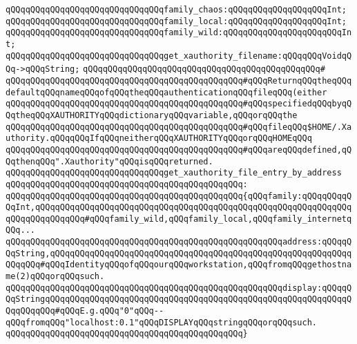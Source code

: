 \verb|qQQqqQQqqQQqqQQqqQQqqQQqqQQqqQQqfamily_chaos:qQQqqQQqqQQqqQQqqQQqInt;|\newline
\verb|qQQqqQQqqQQqqQQqqQQqqQQqqQQqqQQqfamily_local:qQQqqQQqqQQqqQQqqQQqInt;|\newline
\verb|qQQqqQQqqQQqqQQqqQQqqQQqqQQqqQQqfamily_wild:qQQqqQQqqQQqqQQqqQQqqQQqInt;|\newline
\newline
\verb|qQQqqQQqqQQqqQQqqQQqqQQqqQQqqQQqget_xauthority_filename:qQQqqQQqVoidqQQq->qQQqString;|\newline
\verb|qQQqqQQqqQQqqQQqqQQqqQQqqQQqqQQqqQQqqQQqqQQqqQQq#|\newline
\verb|qQQqqQQqqQQqqQQqqQQqqQQqqQQqqQQqqQQqqQQqqQQqqQQq#qQQqReturnqQQqtheqQQqdefaultqQQqnameqQQqofqQQqtheqQQqauthenticationqQQqfileqQQq(either|\newline
\verb|qQQqqQQqqQQqqQQqqQQqqQQqqQQqqQQqqQQqqQQqqQQqqQQq#qQQqspecifiedqQQqbyqQQqtheqQQqXAUTHORITYqQQqdictionaryqQQqvariable,qQQqorqQQqthe|\newline
\verb|qQQqqQQqqQQqqQQqqQQqqQQqqQQqqQQqqQQqqQQqqQQqqQQq#qQQqfileqQQq$HOME/.Xauthority.qQQqqQQqIfqQQqneitherqQQqXAUTHORITYqQQqorqQQqHOMEqQQq|\newline
\verb|qQQqqQQqqQQqqQQqqQQqqQQqqQQqqQQqqQQqqQQqqQQqqQQq#qQQqareqQQqdefined,qQQqthenqQQq".Xauthority"qQQqisqQQqreturned.|\newline
\newline
\newline
\verb|qQQqqQQqqQQqqQQqqQQqqQQqqQQqqQQqget_xauthority_file_entry_by_address|\newline
\verb|qQQqqQQqqQQqqQQqqQQqqQQqqQQqqQQqqQQqqQQqqQQqqQQq:|\newline
\verb|qQQqqQQqqQQqqQQqqQQqqQQqqQQqqQQqqQQqqQQqqQQqqQQq{qQQqfamily:qQQqqQQqqQQqInt,qQQqqQQqqQQqqQQqqQQqqQQqqQQqqQQqqQQqqQQqqQQqqQQqqQQqqQQqqQQqqQQqqQQqqQQqqQQqqQQq#qQQqfamily_wild,qQQqfamily_local,qQQqfamily_internetqQQq...|\newline
\verb|qQQqqQQqqQQqqQQqqQQqqQQqqQQqqQQqqQQqqQQqqQQqqQQqqQQqqQQqaddress:qQQqqQQqString,qQQqqQQqqQQqqQQqqQQqqQQqqQQqqQQqqQQqqQQqqQQqqQQqqQQqqQQqqQQqqQQqqQQq#qQQqIdentityqQQqofqQQqourqQQqworkstation,qQQqfromqQQqgethostname(2)qQQqorqQQqsuch.|\newline
\verb|qQQqqQQqqQQqqQQqqQQqqQQqqQQqqQQqqQQqqQQqqQQqqQQqqQQqqQQqdisplay:qQQqqQQqStringqQQqqQQqqQQqqQQqqQQqqQQqqQQqqQQqqQQqqQQqqQQqqQQqqQQqqQQqqQQqqQQqqQQqqQQq#qQQqE.g.qQQq"0"qQQq--qQQqfromqQQq"localhost:0.1"qQQqDISPLAYqQQqstringqQQqorqQQqsuch.|\newline
\verb|qQQqqQQqqQQqqQQqqQQqqQQqqQQqqQQqqQQqqQQqqQQqqQQq}|\newline

